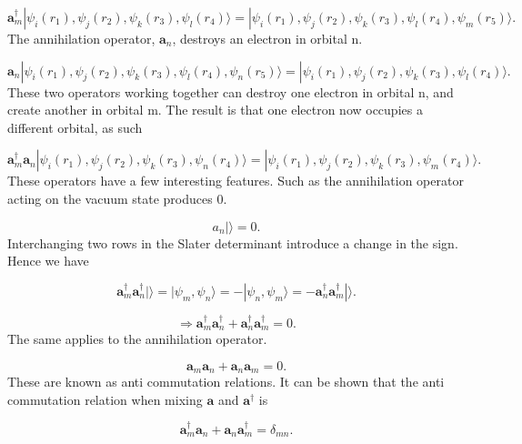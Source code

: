 \documentclass[graybox,sectrefs,envcountresetchap,open=right]{svmonodo}
\begin{document}
\begin{equation}
\mathbf{a}^{\dagger}_m |\psi_i(r_1), \psi_j(r_2), \psi_k(r_3), \psi_l(r_4) \rangle = |\psi_i(r_1), \psi_j(r_2), \psi_k(r_3), \psi_l(r_4), \psi_m(r_5) \rangle .
\end{equation}
The annihilation operator, $\mathbf{a}_n$, destroys an electron in orbital n.

\begin{equation}
\mathbf{a}_n |\psi_i(r_1), \psi_j(r_2), \psi_k(r_3), \psi_l(r_4), \psi_n(r_5) \rangle = |\psi_i(r_1), \psi_j(r_2), \psi_k(r_3), \psi_l(r_4) \rangle  .
\end{equation}
These two operators working together can destroy one electron in orbital n, and create another in orbital m. The result is that one electron now occupies a different orbital, as such

\begin{equation}
\mathbf{a}^{\dagger}_m \mathbf{a}_n |\psi_i(r_1), \psi_j(r_2), \psi_k(r_3), \psi_n(r_4) \rangle = |\psi_i(r_1), \psi_j(r_2), \psi_k(r_3), \psi_m(r_4) \rangle .
\end{equation} 
These operators have a few interesting features. Such as the annihilation operator acting on the vacuum state produces 0.

\begin{equation}
a_n | \rangle = 0  .
\end{equation} 
Interchanging two rows in the Slater determinant introduce a change in the sign. Hence we have

\begin{equation}
\mathbf{a}^{\dagger}_m \mathbf{a}^{\dagger}_n | \rangle = |\psi_m, \psi_n \rangle = - |\psi_n, \psi_m \rangle = -\mathbf{a}^{\dagger}_n \mathbf{a}^{\dagger}_m | \rangle  .
\end{equation} 

\begin{equation}
\Rightarrow \mathbf{a}^{\dagger}_m \mathbf{a}^{\dagger}_n + \mathbf{a}^{\dagger}_n \mathbf{a}^{\dagger}_m = 0 .
\end{equation} 
The same applies to the annihilation operator.

\begin{equation}
\mathbf{a}_m \mathbf{a}_n + \mathbf{a}_n \mathbf{a}_m = 0 .
\end{equation} 
These are known as anti commutation relations. It can be shown that the anti commutation relation when mixing $\mathbf{a}$ and $\mathbf{a}^{\dagger}$ is

\begin{equation}
\mathbf{a}^{\dagger}_m \mathbf{a}_n + \mathbf{a}_n \mathbf{a}^{\dagger}_m = \delta_{mn} . \label{ccsd_anni_creato_operator_combo}
\end{equation} 
\end{document}
